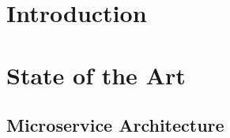 \documentclass{Configuration_Files/PoliMi3i_thesis}
\begin{document}
\thispagestyle{empty}
\tableofcontents %
\thispagestyle{empty}
\cleardoublepage

%
%
%    
%

\mainmatter %

\chapter{Introduction}

\chapter{State of the Art}
\label{ch:art}%

\section{Microservice Architecture}
\label{sec:ms_arch}
\end{document}
